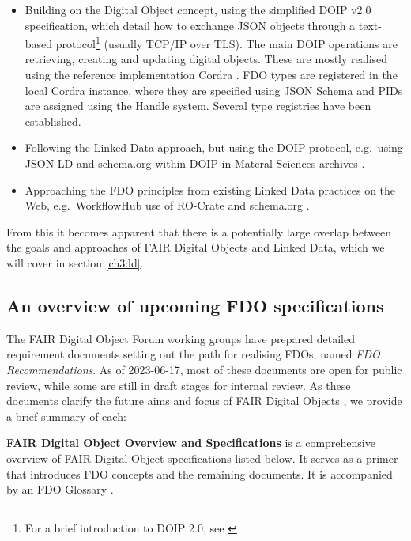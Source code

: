 \begin{itemize}
\tightlist
\item
  Building on the Digital Object concept, using the simplified \acrfull{DOIP} v2.0 \cite{DONA 2018} specification, which detail how to exchange \gls{JSON} objects through a text-based protocol\footnote{For a brief introduction to DOIP 2.0, see \cite{CNRI 2023b}} (usually TCP/IP over TLS). The main DOIP operations are retrieving, creating and updating digital objects. These are mostly realised using the reference implementation Cordra \cite{Tupelo-Scheck 2022}. FDO types are registered in the local Cordra instance, where they are specified using JSON Schema \cite{Wright 2022} and PIDs are assigned using the Handle system. Several type registries have been established.
\item
  Following the Linked Data approach, but using the DOIP protocol, e.g.~using \gls{JSON-LD} and schema.org within DOIP in Materal Sciences archives \cite{Riccardi 2022}.
\item
  Approaching the FDO principles from existing Linked Data practices on the Web, e.g.~WorkflowHub use of RO-Crate and schema.org \cite{Soiland-Reyes 2022c}.
\end{itemize}

From this it becomes apparent that there is a potentially large overlap between the goals and approaches of FAIR Digital Objects and Linked Data, which we will cover in section \vref{ch3:ld}.


\subsection{An overview of upcoming FDO specifications}\label{ch3:next-step-fdo}

The FAIR Digital Object Forum \cite{FAIRDigitalObjects} working groups have prepared detailed requirement documents \cite{FDO Specs} setting out the path for realising FDOs, named \emph{FDO Recommendations}. As of 2023-06-17, most of these documents are open for public review, while some are still in draft stages for internal review. As these documents clarify the future aims and focus of FAIR Digital Objects \cite{Lannom 2022b}, we provide a brief summary of each:

\textbf{FAIR Digital Object Overview and Specifications} \cite{Ivonne 2023} is a comprehensive overview of FAIR Digital Object specifications listed below. It serves as a primer that introduces FDO concepts and the remaining documents. It is accompanied by an FDO Glossary \cite{Broeder 2022}.

